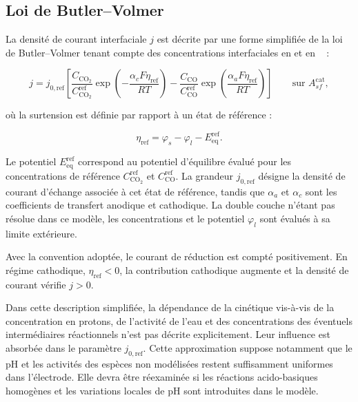\subsection*{Loi de Butler--Volmer}

La densité de courant interfaciale $j$ est décrite par une forme
simplifiée de la loi de Butler--Volmer tenant compte des concentrations
interfaciales en  et en %
~\cite{dickinsonButlerVolmerEquationElectrochemical2020} :

\begin{equation}
j =
j_{0,\mathrm{ref}}
\left[
\frac{C_{\mathrm{CO_2}}}
     {C_{\mathrm{CO_2}}^{\mathrm{ref}}}
\exp\!\left(
-\frac{\alpha_c F \eta_{\mathrm{ref}}}{RT}
\right)
-
\frac{C_{\mathrm{CO}}}
     {C_{\mathrm{CO}}^{\mathrm{ref}}}
\exp\!\left(
\frac{\alpha_a F \eta_{\mathrm{ref}}}{RT}
\right)
\right]
\qquad
\text{sur } A_{sf}^{\mathrm{cat}},
\label{eq:BV}
\end{equation}

où la surtension est définie par rapport à un état de référence :

\begin{equation}
\eta_{\mathrm{ref}}
=
\varphi_s
-
\varphi_l
-
E_{\mathrm{eq}}^{\mathrm{ref}}.
\label{eq:surtension_ref}
\end{equation}

Le potentiel $E_{\mathrm{eq}}^{\mathrm{ref}}$ correspond au potentiel
d'équilibre évalué pour les concentrations de référence
$C_{\mathrm{CO_2}}^{\mathrm{ref}}$ et
$C_{\mathrm{CO}}^{\mathrm{ref}}$.
La grandeur $j_{0,\mathrm{ref}}$ désigne la densité de courant d'échange
associée à cet état de référence, tandis que $\alpha_a$ et $\alpha_c$
sont les coefficients de transfert anodique et cathodique. La double couche
n'étant pas résolue dans ce modèle, les concentrations et le potentiel
$\varphi_l$ sont évalués à sa limite extérieure.

Avec la convention adoptée, le courant de réduction est compté
positivement. En régime cathodique,
$\eta_{\mathrm{ref}} < 0$, la contribution cathodique augmente et la
densité de courant vérifie $j>0$.

Dans cette description simplifiée, la dépendance de la cinétique vis-à-vis
de la concentration en protons, de l'activité de l'eau et des concentrations
des éventuels intermédiaires réactionnels n'est pas décrite explicitement.
Leur influence est absorbée dans le paramètre $j_{0,\mathrm{ref}}$. Cette approximation
suppose notamment que le pH et les activités des espèces non modélisées
restent suffisamment uniformes dans l'électrode. Elle devra être
réexaminée si les réactions acido-basiques homogènes et les variations
locales de pH sont introduites dans le modèle.

